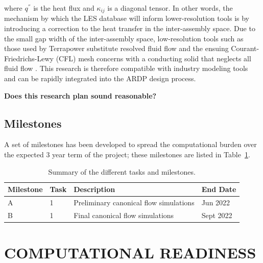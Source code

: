 where \(q^{''}\) is the heat flux and \(\kappa_{ij}\) is a diagonal tensor. In other words, the mechanism by which the LES database will inform lower-resolution tools is by introducing a correction to the heat transfer in the inter-assembly space. Due to the small gap width of the inter-assembly space, low-resolution tools such as those used by Terrapower substitute resolved fluid flow and the ensuing Courant-Friedrichs-Lewy (CFL) mesh concerns with a conducting solid that neglects all fluid flow \cite{touran}. This research is therefore compatible with industry modeling tools and can be rapidly integrated into the ARDP design process.

{\bf Does this research plan sound reasonable?}


\vspace{-.25in}
\subsection{Milestones}
\vspace{-.2in}


A set of milestones has been developed to spread the computational burden over
the expected 3 year term of the project; these milestones are listed in Table~\ref{tab:milestones}.

\begin{table}
\centering
\caption{Summary of the different tasks and milestones.}
\begin{tabular}{llll}
\toprule
Milestone & Task & Description & End Date \\
\midrule
A & 1 & Preliminary canonical flow simulations   & Jun  2022 \\
B & 1 & Final canonical flow simulations         & Sept 2022 \\
\bottomrule
\end{tabular}
\label{tab:milestones}
\end{table}

\vspace{-.25in}
\section{COMPUTATIONAL READINESS} %
\vspace{-.2in}

